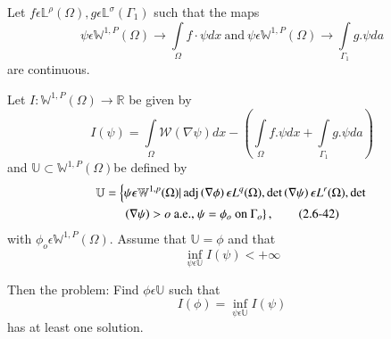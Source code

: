\begin{theorem}[J. BALL]
\begin{itemize}
Let $f \epsilon \mathbb{L}^\rho(\Omega), g \epsilon
\mathbb{L}^\sigma(\Gamma_1)$ such that the maps 
$$
\psi \epsilon \mathbb{W}^{1,P}(\Omega) \to \int\limits_\Omega
f \cdot\psi dx ~\text{and}~ \psi \epsilon \mathbb{W}^{1,P}(\Omega) \to
\int\limits_{\Gamma_1}g. \psi da 
$$
are continuous.

Let $I:\mathbb{W}^{1,P}(\Omega) \to \mathbb{R}$ be given by
\begin{equation*}
I(\psi)=\int\limits_\Omega \mathcal{W} \left(\nabla \psi\right)dx -
\left(\int\limits_\Omega f.\psi dx + \int\limits_{\Gamma_1}g. \psi da\right)
\tag{2.6-41} \label{eq2.6-41}
\end{equation*}
and $\mathbb{U}\subset \mathbb{W}^{1,P}(\Omega)$be defined by
\begin{multline*}
\mathbb{U}= \left\{\psi \epsilon \mathbb{W}^{1,p}(\Omega)| \operatorname{adj}
\left(\nabla \phi\right)\epsilon L^q(\Omega), \det 
\left(\nabla \psi\right) \epsilon L^r(\Omega),
\det\right.\\  
\left.\left(\nabla \psi\right)> o ~\text{a.e.,}~ \psi =
\phi_o ~\text{on}~ \Gamma_o\right\}, \tag{2.6-42}  \label{eq2.6-42}
\end{multline*}
with $\phi_o \epsilon \mathbb{W}^{1,P}(\Omega)$. Assume that
$\mathbb{U}=\phi$ and that 
$$
\inf_{\psi \epsilon \mathbb{U}}I(\psi) < + \infty
$$

Then the problem: Find $\phi \epsilon \mathbb{U}$ such that 
\begin{equation*}
I(\phi)=\inf_{\psi \epsilon \mathbb{U}}
I(\psi) \tag{2.6-43}\label{eq2.6-43} 
\end{equation*}
has at least one solution.
\end{itemize}
\end{theorem}

